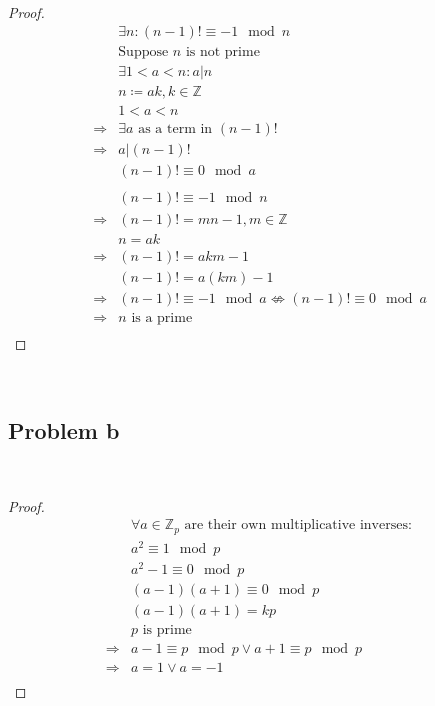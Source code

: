 \documentclass{article}
\begin{document}
~

\begin{proof}
    \begin{align*}
        &\exists n:(n-1)!\equiv -1\mod n\\
        &\text{Suppose }n\text{ is not prime}\\
        &\exists 1<a<n:a|n\\
        &n\coloneqq ak,k\in\mathbb{Z} \\
        &1<a<n\\
        \Rightarrow&\exists a\text{ as a term in }(n-1)!\\
        \Rightarrow&a|(n-1)!\\
        &(n-1)!\equiv 0\mod a\\
        &\\
        &(n-1)!\equiv -1\mod n\\
        \Rightarrow&(n-1)!=mn-1,m\in\mathbb{Z} \\
        &n=ak\\
        \Rightarrow&(n-1)!=akm-1\\
        &(n-1)!=a(km)-1\\
        \Rightarrow&(n-1)!\equiv -1\mod a\nLeftrightarrow (n-1)!\equiv 0\mod a\\
        \Rightarrow&n\text{ is a prime}\\
    \end{align*}
\end{proof}

~

\subsection*{Problem b}

~

\begin{proof}
    \begin{align*}
        &\forall a\in \mathbb{Z} _p\text{ are their own multiplicative inverses}:\\
        &a^2\equiv 1\mod p\\
        &a^2-1\equiv 0\mod p\\
        &(a-1)(a+1)\equiv 0\mod p\\
        &(a-1)(a+1)=kp\\
        &p\text{ is prime}\\
        \Rightarrow&a-1\equiv p\mod p\lor a+1\equiv p\mod p\\
        \Rightarrow&a=1\lor a=-1\\
    \end{align*}
\end{proof}
\end{document}
